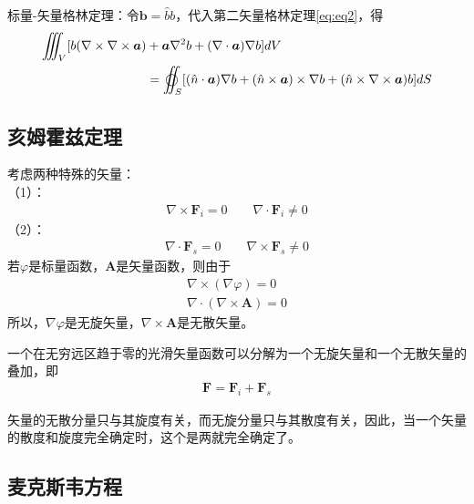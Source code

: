 \documentclass{article}
\numberwithin{equation}{section}
\renewcommand{\vec}[1]{\boldsymbol{#1}}
\begin{document}
\par
标量-矢量格林定理：令$\vec{b}=\hat{b}b$，代入第二矢量格林定理\ref{eq:eq2}，得
\begin{align}
    \iiint _V [b(\nabla \times \nabla \times \vec{a})&+\vec{a}\nabla^2 b+(\nabla \cdot \vec{a})\nabla b]dV \nonumber \\
    &=\varoiint _S[(\hat{n}\cdot \vec{a})\nabla b+(\hat{n}\times \vec{a})\times\nabla b+(\hat{n}\times\nabla\times\vec{a})b]dS
\end{align}

\subsection{亥姆霍兹定理}
考虑两种特殊的矢量：\\
（1）\textbf{\color{blue}{无旋矢量}}：
\begin{align}
    \nabla \times \vec{F}_i = 0 \qquad \nabla \cdot \vec{F}_i \neq 0
\end{align}
（2）\textbf{\color{blue}{无散矢量}}：
\begin{align}
    \nabla \cdot \vec{F}_s = 0 \qquad \nabla \times \vec{F}_s \neq 0
\end{align}
若$\varphi$是标量函数，$\vec{A}$是矢量函数，则由于
\begin{align}
    \nabla \times (\nabla \varphi)=0 \\
    \label{eq:eq11}
    \nabla \cdot (\nabla \times \vec{A})=0
\end{align}
所以，$\nabla \varphi$是无旋矢量，$\nabla \times \vec{A}$是无散矢量。\par
一个在无穷远区趋于零的光滑矢量函数可以分解为一个无旋矢量和一个无散矢量的叠加，即
\begin{align}
    \vec{F}=\vec{F}_i+\vec{F}_s
\end{align}
\par
\textbf{\color{blue}{亥姆霍兹定理：}}矢量的无散分量只与其旋度有关，而无旋分量只与其散度有关，因此，当一个矢量的散度和旋度完全确定时，这个是两就完全确定了。

\subsection{麦克斯韦方程}
\end{document}
